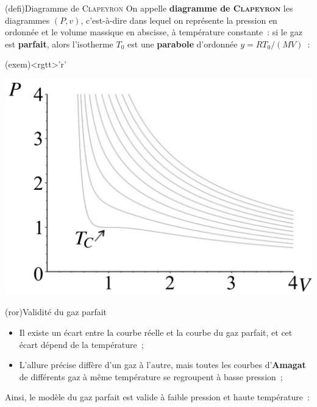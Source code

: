 \documentclass[../../main/main.tex]{subfiles}
\begin{document}
\begin{tcbraster}[raster equal height=rows, raster columns=3]
	\begin{tcb*}[raster multicolumn=2](defi){Diagramme de \textsc{Clapeyron}}
		On appelle \textbf{diagramme de \textsc{Clapeyron}} les diagrammes $(P,v)$,
		c'est-à-dire dans lequel on représente la pression en ordonnée et le volume
		massique en abscisse, à température constante~: si le gaz est
		\textbf{parfait}, alors l'isotherme $T_0$ est une \textbf{parabole}
		d'ordonnée $y = RT_0/(MV)$~:
		\psw{%
			\[
				(P)\ind{G.P.} = \frac{RT_0}{Mv}
			\]
		}%
		\vspace{-15pt}
	\end{tcb*}
	\begin{tcb}(exem)<rgtt>'r'{}
		\begin{center}
			\includegraphics[width=\linewidth]{clap_intro}
			\captionsetup{justification=centering}
		\end{center}
	\end{tcb}
\end{tcbraster}

\begin{tcb*}(ror){Validité du gaz parfait}
	\begin{itemize}
		\item Il existe un écart entre la courbe réelle et la courbe du gaz parfait,
		      et cet écart dépend de la température~;

		\item L'allure précise diffère d'un gaz à l'autre, mais toutes les courbes
		      d'\textbf{Amagat} de différents gaz à même température se regroupent à
		      basse pression~;
	\end{itemize}
	\bigbreak
	Ainsi, le modèle du gaz parfait est valide à faible pression et haute
	température~:
	\vspace{-15pt}
\end{tcb*}
\end{document}
